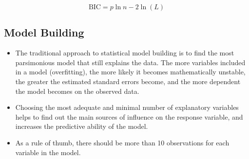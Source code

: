\[\mbox{BIC} = p\ln{n} - 2\ln(L)\]



%
%
%
%




\subsection*{Model Building}
\begin{itemize}
	\item The traditional approach to statistical model building is to find the most parsimonious model that still explains the data. The more variables included in a model (overfitting), the more likely it becomes mathematically unstable, the greater the estimated standard errors become, and the more dependent the model becomes on the observed data. \item Choosing the most adequate and minimal number of explanatory variables helps to find out the main sources of influence on the response variable, and increases the predictive ability of the model. 
	\item As a rule of thumb, there should be more than 10 observations for each variable in the model.
\end{itemize}



